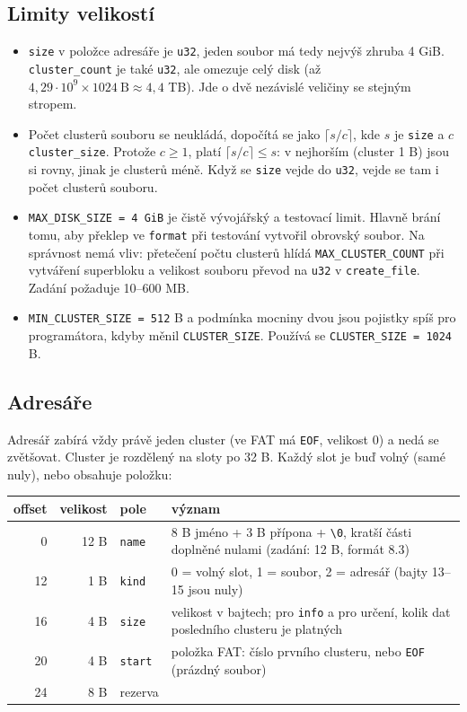 \documentclass[10pt, a4paper]{report}
\newcommand{\code}[1]{\texttt{#1}}
\begin{document}
	\subsection{Limity velikostí}
	
	\begin{itemize}
		\item \code{size} v položce adresáře je \code{u32}, jeden soubor má tedy nejvýš zhruba
		4 GiB. \code{cluster\_count} je také \code{u32}, ale omezuje celý disk
		(až $4{,}29 \cdot 10^9 \times 1024\ \text{B} \approx 4{,}4$ TB). Jde o dvě nezávislé
		veličiny se stejným stropem.
		\item Počet clusterů souboru se neukládá, dopočítá se jako
		$\lceil s / c \rceil$, kde $s$ je \code{size} a $c$ \code{cluster\_size}. Protože $c \ge 1$,
		platí $\lceil s / c \rceil \le s$: v nejhorším
		(cluster 1 B) jsou si rovny, jinak je clusterů méně. Když se \code{size} vejde do
		\code{u32}, vejde se tam i počet clusterů souboru.
		\item \code{MAX\_DISK\_SIZE = 4 GiB} je čistě vývojářský a testovací limit. Hlavně brání
		tomu, aby překlep ve \code{format} při testování vytvořil obrovský soubor. Na správnost nemá
		vliv: přetečení počtu clusterů hlídá \code{MAX\_CLUSTER\_COUNT} při vytváření superbloku
		a velikost souboru převod na \code{u32} v \code{create\_file}. Zadání požaduje 10--600 MB.
		\item \code{MIN\_CLUSTER\_SIZE = 512} B a podmínka mocniny dvou jsou pojistky spíš pro
		programátora, kdyby měnil \code{CLUSTER\_SIZE}. Používá se \code{CLUSTER\_SIZE = 1024} B.
	\end{itemize}
	
	\subsection{Adresáře}
	
	Adresář zabírá vždy právě jeden cluster (ve FAT má \code{EOF}, velikost 0) a nedá se zvětšovat.
	Cluster je rozdělený na sloty po 32 B. Každý slot je buď volný (samé nuly), nebo obsahuje
	položku:
	
	\begin{table}[H]
		\centering
		\begin{tabular}{|r|r|l|p{8cm}|}
			\hline
			\textbf{offset} & \textbf{velikost} & \textbf{pole} & \textbf{význam} \\ \hline
			0 & 12 B & \code{name} & 8 B jméno + 3 B přípona + \code{\textbackslash 0}, kratší části doplněné nulami (zadání: 12 B, formát 8.3) \\ \hline
			12 & 1 B & \code{kind} & 0 = volný slot, 1 = soubor, 2 = adresář (bajty 13--15 jsou nuly) \\ \hline
			16 & 4 B & \code{size} & velikost v bajtech; pro \code{info} a pro určení, kolik dat posledního clusteru je platných \\ \hline
			20 & 4 B & \code{start} & položka FAT: číslo prvního clusteru, nebo \code{EOF} (prázdný soubor) \\ \hline
			24 & 8 B & rezerva & \\ \hline
		\end{tabular}
	\end{table}
	
\end{document}
